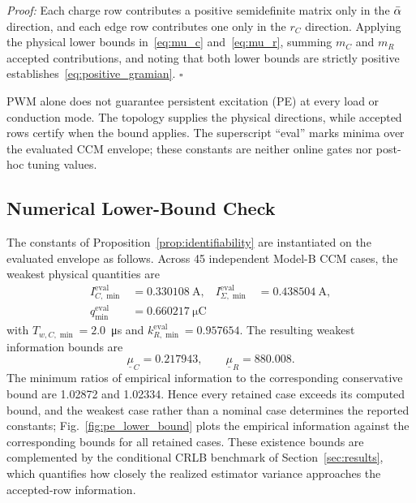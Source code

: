 \emph{Proof:} Each charge row contributes a positive semidefinite matrix only in the $\bar{\alpha}$ direction, and each edge row contributes one only in the $r_C$ direction. Applying the physical lower bounds in~\eqref{eq:mu_c} and~\eqref{eq:mu_r}, summing $m_C$ and $m_R$ accepted contributions, and noting that both lower bounds are strictly positive establishes~\eqref{eq:positive_gramian}. \hfill$\square$

\begin{remark}
\label{rem:conditional}
PWM alone does not guarantee persistent excitation (PE) at every load or conduction mode. The \Cuk{} topology supplies the physical directions, while accepted rows certify when the bound applies. The superscript ``eval'' marks minima over the evaluated CCM envelope; these constants are neither online gates nor post-hoc tuning values.
\end{remark}

\subsection{Numerical Lower-Bound Check}

The constants of Proposition~\ref{prop:identifiability} are instantiated on the evaluated envelope as follows. Across 45 independent Model-B CCM cases, the weakest physical quantities are
\begin{align}
I_{C,\min}^{\mathrm{eval}}&=0.330108~\mathrm{A},&
I_{\Sigma,\min}^{\mathrm{eval}}&=0.438504~\mathrm{A},\nonumber\\
q_{\min}^{\mathrm{eval}}&=0.660217~\si{\micro\coulomb}&&
\end{align}
with $T_{w,C,\min}=2.0$~\si{\micro\second} and $k_{R,\min}^{\mathrm{eval}}=0.957654$. The resulting weakest information bounds are
\begin{equation}
\underline\mu_C=0.217943,\qquad
\underline\mu_R=880.008.
\label{eq:numerical_mu}
\end{equation}
The minimum ratios of empirical information to the corresponding conservative bound are 1.02872 and 1.02334. Hence every retained case exceeds its computed bound, and the weakest case rather than a nominal case determines the reported constants; Fig.~\ref{fig:pe_lower_bound} plots the empirical information against the corresponding bounds for all retained cases. These existence bounds are complemented by the conditional CRLB benchmark of Section~\ref{sec:results}, which quantifies how closely the realized estimator variance approaches the accepted-row information.


